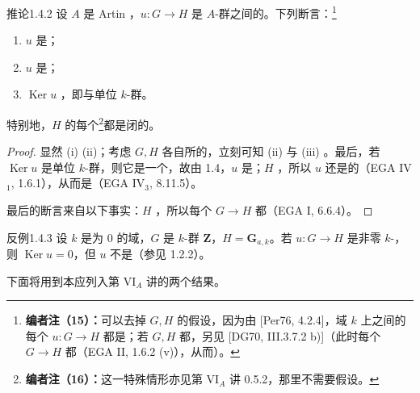 \begin{SGAresult}{推论}{1.4.2}
设 $A$ 是 Artin ，$u:G\to H$ 是 $A$-群之间的。下列断言：\footnote{\textbf{编者注（15）：}可以去掉 $G,H$ 的假设，因为由 [Per76, 4.2.4]，域 $k$ 上之间的每个 $u:G\to H$ 都是；若 $G,H$ 都，另见 [DG70, III.3.7.2 b)]（此时每个 $G\to H$ 都（EGA II, 1.6.2 (v)），从而）。}
\begin{enumerate}
\item[(i)] $u$ 是；
\item[(ii)] $u$ 是；
\item[(iii)] $\operatorname{Ker}u$ ，即与单位 $k$-群。
\end{enumerate}
特别地，$H$ 的每个\footnote{\textbf{编者注（16）：}这一特殊情形亦见第 VI$_A$ 讲 0.5.2，那里不需要假设。}都是闭的。
\end{SGAresult}
\begin{proof}
显然 (i)  (ii)；考虑 $G,H$ 各自所的，立刻可知 (ii) 与 (iii) 。最后，若 $\operatorname{Ker}u$ 是单位 $k$-群，则它是一个，故由 1.4，$u$ 是；$H$ ，所以 $u$ 还是的（EGA IV$_1$, 1.6.1），从而是（EGA IV$_3$, 8.11.5）。

最后的断言来自以下事实：$H$ ，所以每个 $G\to H$ 都（EGA I, 6.6.4）。
\end{proof}
\begin{SGAresult}{反例}{1.4.3}
设 $k$ 是为 $0$ 的域，$G$ 是 $k$-群 $\mathbf Z$，$H=\mathbf G_{a,k}$。若 $u:G\to H$ 是非零 $k$-，则 $\operatorname{Ker}u=0$，但 $u$ 不是（参见 1.2.2）。
\end{SGAresult}
下面将用到本应列入第 VI$_A$ 讲的两个结果。
